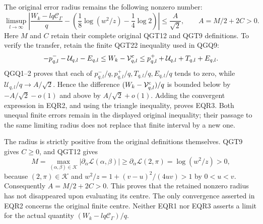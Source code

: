 \documentclass[11pt,a4paper]{article}
\begin{document}
The original error radius remains the following nonzero number:
\begin{equation}\tag{EQR3}
\boxed{\displaystyle
\limsup_{l\to\infty}
\left|
\frac{W_k-lq\mathcal C_\Gamma}{q}
-\left(\frac18\log(w^2/z)-\frac14\log2\right)
\right|
\leq\frac A{\sqrt2},
\qquad A=M/2+2C>0.}
\end{equation}
Here $M$ and $C$ retain their complete original QGT12 and QGT9
definitions. To verify the transfer, retain the finite QGT22
inequality used in QGQ9:
\[
-p^-_{q,l}-\mathcal U_{q,l}-E_{q,l}
\leq W_k-\mathcal V^{\rm c}_{q,l}
\leq p^+_{q,l}+\mathcal U_{q,l}+T_{q,l}+E_{q,l}.
\]
QGQ1--2 proves that each of
$p^-_{q,l}/q,p^+_{q,l}/q,T_{q,l}/q,E_{q,l}/q$ tends to zero,
while $\mathcal U_{q,l}/q\to A/\sqrt2$. Hence the difference
$(W_k-\mathcal V^{\rm c}_{q,l})/q$ is bounded below by
$-A/\sqrt2-o(1)$ and above by $A/\sqrt2+o(1)$.
Adding the convergent expression in EQR2, and using the triangle
inequality, proves EQR3. Both unequal finite errors remain in the
displayed original inequality; their passage to the same limiting
radius does not replace that finite interval by a new one.

The radius is strictly positive from the original definitions
themselves. QGT9 gives $C\geq0$, and QGT12 gives
\[
M=\max_{(\alpha,\beta)\in\mathcal K}
|\partial_\alpha\mathcal L(\alpha,\beta)|
\geq\partial_\alpha\mathcal L(2,\pi)=\log(w^2/z)>0,
\]
because $(2,\pi)\in\mathcal K$ and
$w^2/z=1+(v-u)^2/(4uv)>1$ by $0<u<v$.
Consequently $A=M/2+2C>0$. This proves that the retained
nonzero radius has not disappeared upon evaluating its centre.
The only convergence asserted in EQR2 concerns the original
finite centre. Neither EQR1 nor EQR3 asserts a limit for the
actual quantity $(W_k-lq\mathcal C_\Gamma)/q$.

\end{document}
